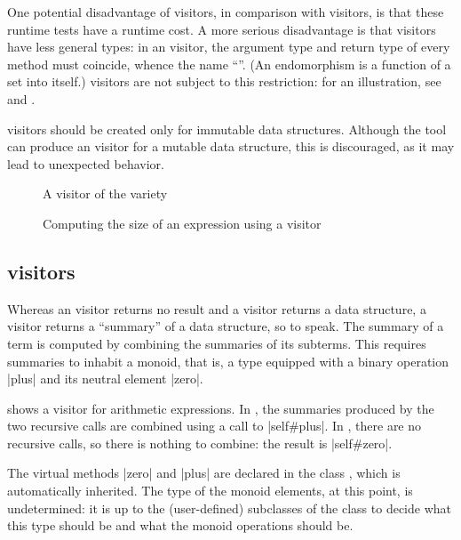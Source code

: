 \documentclass[11pt,a4paper,twoside]{article}
\begin{document}
One potential disadvantage of \mapendo visitors, in comparison with \map
visitors, is that these runtime tests have a runtime cost. A more serious
disadvantage is that \mapendo visitors have less general types: in an \mapendo
visitor, the argument type and return type of every method must coincide,
whence the name ``\mapendo''.
%
(An endomorphism is a function of a set into itself.)
%
\map visitors are not subject to this restriction: for an illustration, see
 and .

\mapendo visitors should be created only for immutable data
structures. Although the tool can produce an \mapendo visitor for a mutable
data structure, this is discouraged, as it may lead to unexpected behavior.


\begin{figure}[p]
\vspace{-\baselineskip}
\caption{A visitor of the \reduce variety}
\label{fig:expr15}
\end{figure}

\begin{figure}[t]
\caption{Computing the size of an expression using a \reduce visitor}
\label{fig:reduce}
\end{figure}

\subsection{\reduce visitors}
\label{sec:intro:reduce}

Whereas an \iter visitor returns no result and a \map visitor returns a data
structure, a \reduce visitor returns a ``summary'' of a data structure, so to
speak. The summary of a term is computed by combining the summaries of its
subterms. This requires summaries to inhabit a monoid, that is, a type
equipped with a binary operation \oc|plus| and its neutral element \oc|zero|.

 shows a \reduce visitor for arithmetic expressions. In
, the summaries produced by the two recursive calls are
combined using a call to \oc|self#plus|. In , there are
no recursive calls, so there is nothing to combine: the result is
\oc|self#zero|.

The virtual methods \oc|zero| and \oc|plus| are declared in the class
, which is automatically inherited. The type of the
monoid elements, at this point, is undetermined: it is up to the
(user-defined) subclasses of the class \reduce to decide what this type should
be and what the monoid operations should be.
\end{document}
